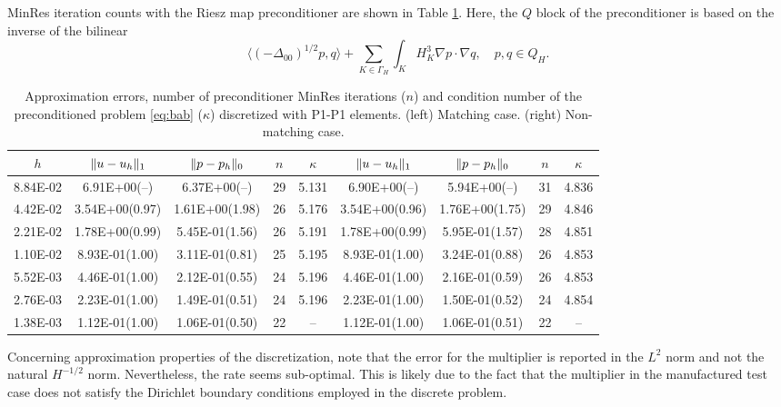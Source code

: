 \documentclass[r]{siamart171218}
\begin{document}
MinRes iteration counts with the Riesz map preconditioner are shown in
Table \ref{tab:p1_p1}. Here, the $Q$ block of the preconditioner is based
on the inverse of the bilinear 
\[
\langle (-\Delta_{00})^{1/2} p, q\rangle + \sum_{K\in\Gamma_H}\int_{K} H_K^3\nabla p \cdot\nabla q,\quad p, q\in Q_H.
\]
%

\begin{table}
  \begin{center}
    \footnotesize{
  \begin{tabular}{c|cc|c|c||cc|c|c}
    \hline
    $h$ & $\lVert{u-u_h}\rVert_1$ & $\lVert{p-p_h}\rVert_0$ & $n$ & $\kappa$
        & $\lVert{u-u_h}\rVert_1$ & $\lVert{p-p_h}\rVert_0$ & $n$ & $\kappa$ \\
    \hline
8.84E-02 & 6.91E+00(--)   & 6.37E+00(--)   & 29 & 5.131 & 6.90E+00(--)  & 5.94E+00(--)    & 31 & 4.836\\
4.42E-02 & 3.54E+00(0.97) & 1.61E+00(1.98) & 26 & 5.176 & 3.54E+00(0.96) & 1.76E+00(1.75) & 29 & 4.846\\
2.21E-02 & 1.78E+00(0.99) & 5.45E-01(1.56) & 26 & 5.191 & 1.78E+00(0.99) & 5.95E-01(1.57) & 28 & 4.851\\
1.10E-02 & 8.93E-01(1.00) & 3.11E-01(0.81) & 25 & 5.195 & 8.93E-01(1.00) & 3.24E-01(0.88) & 26 & 4.853\\
5.52E-03 & 4.46E-01(1.00) & 2.12E-01(0.55) & 24 & 5.196 & 4.46E-01(1.00) & 2.16E-01(0.59) & 26 & 4.853\\
2.76E-03 & 2.23E-01(1.00) & 1.49E-01(0.51) & 24 & 5.196 & 2.23E-01(1.00) & 1.50E-01(0.52) & 24 & 4.854\\
1.38E-03 & 1.12E-01(1.00) & 1.06E-01(0.50) & 22 & --    & 1.12E-01(1.00) & 1.06E-01(0.51) & 22 & --   \\
    \hline
  \end{tabular}
  }
    \caption{Approximation errors, number of preconditioner MinRes iterations ($n$) and
      condition number of the preconditioned problem \eqref{eq:bab} ($\kappa$) discretized
      with P1-P1 elements. (left) Matching case. (right) Non-matching case.}
  \label{tab:p1_p1}
  \end{center}
\end{table}
%
Concerning approximation properties of the discretization, note that the error
for the multiplier is reported in the $L^2$ norm and not the natural $H^{-1/2}$
norm. Nevertheless, the rate seems sub-optimal. This is likely due to the fact
that the multiplier in the manufactured test case does not satisfy the
Dirichlet boundary conditions employed in the discrete problem.
\end{document}
